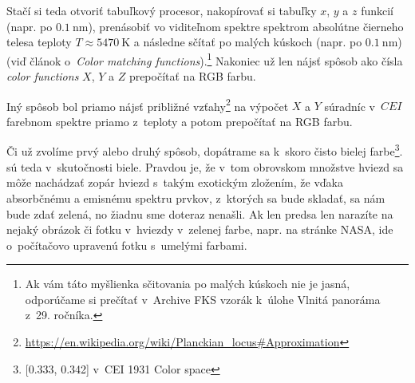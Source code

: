 Stačí si teda otvoriť tabuľkový procesor, nakopírovať si tabuľky $x$, $y$ a $z$ funkcií (napr. po $\SI{0.1}{\nano\metre}$), prenásobiť vo viditeľnom spektre spektrom
absolútne čierneho telesa teploty $T \approx \SI{5470}{\kelvin}$ a následne sčítať po malých kúskoch (napr. po $\SI{0.1}{\nano\metre}$)
(viď článok o~\emph{Color matching functions}).\footnote{Ak vám táto myšlienka sčitovania po malých kúskoch nie je jasná,
odporúčame si prečítať v~Archive FKS vzorák k~úlohe Vlnitá panoráma z~29. ročníka.} Nakoniec už len nájsť spôsob ako čísla \emph{color functions} $X$, $Y$ a $Z$ prepočítať na RGB farbu. 

Iný spôsob bol priamo nájsť približné vzťahy\footnote{\url{https://en.wikipedia.org/wiki/Planckian_locus\#Approximation}} na výpočet $X$ a $Y$ súradníc v~$CEI$ farebnom spektre priamo z~teploty a potom prepočítať na RGB farbu.

Či už zvolíme prvý alebo druhý spôsob, dopátrame sa k~skoro čisto bielej farbe\footnote{[0.333, 0.342] v~CEI 1931 Color space}.
 sú teda v~skutočnosti biele. Pravdou je, že v~tom obrovskom množstve hviezd sa môže nachádzať zopár hviezd s~takým exotickým zložením, že vďaka absorbčnému a emisnému spektru prvkov, z~ktorých sa bude skladať, sa nám bude zdať zelená, no žiadnu sme doteraz nenašli. Ak len predsa len narazíte na nejaký obrázok či fotku v~hviezdy v~zelenej farbe, napr. na stránke NASA, ide o~počítačovo upravenú fotku s~umelými farbami.
